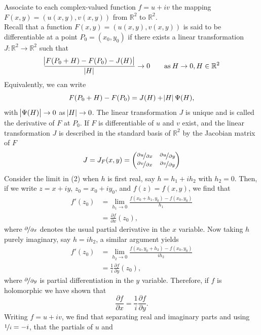 \documentclass{article}
\theoremstyle{definition}
\theoremstyle{remark}
\begin{document}
    Associate to each complex-valued function $f = u + iv$ the mapping $F(x,y) = (u(x,y),v(x,y))$ from $\mathbb{R}^2$ to 
    $\mathbb{R}^2$.\\
    Recall that a function $F(x,y) = (u(x,y),v(x,y))$ is said to be differentiable at a point $P_0 = (x_0,y_0)$ if there exists a
    linear transformation $J:\mathbb{R}^2\to\mathbb{R}^2$ such that
    \begin{align}
        \frac{\abs{F(P_0+H)-F(P_0)-J(H)}}{\abs{H}} \to 0\qquad\text{as}\:H\to0, H\in\mathbb{R}^2 
    \end{align}
    Equivalently, we can write
    \[ F(P_0+H) - F(P_0) = J(H) + \abs{H}\Psi(H), \]
    with $\abs{\Psi(H)}\to0$ as $\abs{H}\to0$. The linear transformation $J$ is unique and is called the derivative of $F$ at $P_0$.
    If $F$ is differentiable of $u$ and $v$ exist, and the linear transformation $J$ is described in the standard basis of $\mathbb{R}^2$
    by the Jacobian matrix of $F$
    \[ J = J_F(x,y) = \begin{pmatrix} \nicefrac{\partial{u}}{\partial{x}} & \nicefrac{\partial{u}}{\partial{y}}  \\
            \nicefrac{\partial{v}}{\partial{x}} & \nicefrac{\partial{v}}{\partial{y}} \end{pmatrix} \]
    Consider the limit in (2) when $h$ is first real, say $h=h_1+ih_2$ with $h_2=0$. Then, if we write $z=x+iy$, $z_0=x_0+iy_0$, and
    $f(z) = f(x,y)$, we find that
    \begin{align*}
        f'(z_0) &= \lim_{h_1\to0} \frac{f(x_0+h_1,y_0)-f(x_0,y_0)}{h_1} \\
        &= \frac{\partial{f}}{\partial{x}}(z_0),
    \end{align*}
    where $\nicefrac{\partial}{\partial{x}}$ denotes the usual partial derivative in the $x$ variable. Now taking $h$ purely imaginary,
    say $h = ih_2$, a similar argument yields
    \begin{align*}
        f'(z_0) &= \lim_{h_2\to0} \frac{f(x_0,y_0+h_2)-f(x_0,y_0)}{ih_2} \\
        &= \frac{1}{i} \frac{\partial{f}}{\partial{y}}(z_0),
    \end{align*}
    where $\nicefrac{\partial}{\partial{y}}$ is partial differentiation in the $y$ variable. Therefore, if $f$ is holomorphic we have
    shown that
    \[ \frac{\partial{f}}{\partial{x}} = \frac{1}{i}\frac{\partial{f}}{\partial{y}}. \]
    Writing $f = u+iv$, we find that separating real and imaginary parts and using $\nicefrac{1}{i}=-i$, that the partials of $u$ and
\end{document}
